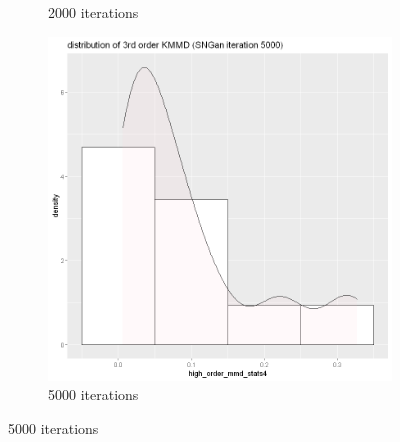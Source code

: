 \documentclass{article}
\begin{document}
\begin{figure}[h!]
\begin{subfigure}[b]{0.3\textwidth}
         \caption{2000 iterations}
     \end{subfigure}
     \hfill
     \begin{subfigure}[b]{0.3\textwidth}
         \centering
         \includegraphics[width=\textwidth]{kmmd_figures/sngan_flower_highdist_5000.png}
         \caption{5000 iterations}
     \end{subfigure}
\end{figure}
\end{document}
